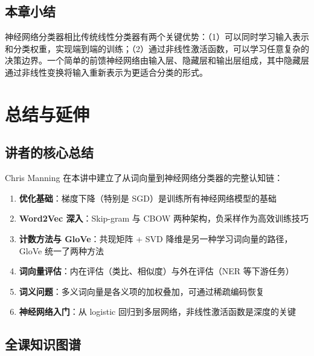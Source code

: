 \documentclass[a4paper]{article}
\begin{document}
\subsection{本章小结}

神经网络分类器相比传统线性分类器有两个关键优势：（1）可以同时学习输入表示和分类权重，实现端到端的训练；（2）通过非线性激活函数，可以学习任意复杂的决策边界。一个简单的前馈神经网络由输入层、隐藏层和输出层组成，其中隐藏层通过非线性变换将输入重新表示为更适合分类的形式。


\section{总结与延伸}

\subsection{讲者的核心总结}

Chris Manning 在本讲中建立了从词向量到神经网络分类器的完整认知链：

\begin{enumerate}
    \item \textbf{优化基础}：梯度下降（特别是 SGD）是训练所有神经网络模型的基础
    \item \textbf{Word2Vec 深入}：Skip-gram 与 CBOW 两种架构，负采样作为高效训练技巧
    \item \textbf{计数方法与 GloVe}：共现矩阵 + SVD 降维是另一种学习词向量的路径，GloVe 统一了两种方法
    \item \textbf{词向量评估}：内在评估（类比、相似度）与外在评估（NER 等下游任务）
    \item \textbf{词义问题}：多义词向量是各义项的加权叠加，可通过稀疏编码恢复
    \item \textbf{神经网络入门}：从 logistic 回归到多层网络，非线性激活函数是深度的关键
\end{enumerate}

\subsection{全课知识图谱}
\end{document}
